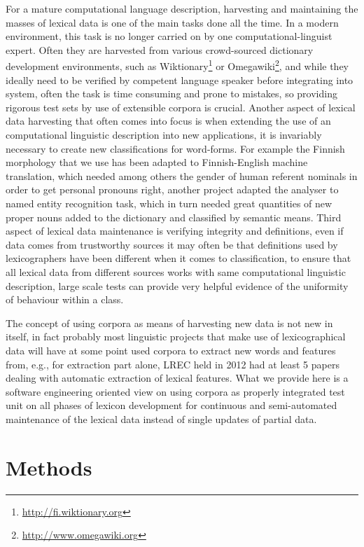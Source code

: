 \documentclass[a5paper]{article}
\begin{document}
For a mature computational language description, harvesting and maintaining the
masses of lexical data is one of the main tasks done all the time. In a modern
environment, this task is no longer carried on by one computational-linguist
expert. Often they are harvested from various crowd-sourced dictionary
development environments, such as
Wiktionary\footnote{\url{http://fi.wiktionary.org}} or
O\-mega\-wi\-ki\footnote{\url{http://www.omegawiki.org}}, and while they ideally
need to be verified by competent language speaker before integrating into
system, often the task is time consuming and prone to mistakes, so providing
rigorous test sets by use of extensible corpora is crucial. Another aspect of
lexical data harvesting that often comes into focus is when extending the use
of an computational linguistic description into new applications, it is
invariably necessary to create new classifications for word-forms. For example
the Finnish morphology that we use has been adapted to Finnish-English machine
translation, which needed among others the gender of human referent nominals in
order to get personal pronouns right, another project adapted the analyser to
named entity recognition task, which in turn needed great quantities of new
proper nouns added to the dictionary and classified by semantic means. Third
aspect of lexical data maintenance is verifying integrity and definitions, even
if data comes from trustworthy sources it may often be that definitions used by
lexicographers have been different when it comes to classification, to ensure
that all lexical data from different sources works with same computational
linguistic description, large scale tests can provide very helpful evidence of
the uniformity of behaviour within a class.

The concept of using corpora as means of harvesting new data is not new in
itself, in fact probably most linguistic projects that make use of
lexicographical data will have at some point used corpora to extract new words
and features from, e.g., for extraction part alone, LREC held in 2012 had at
least 5 papers dealing with automatic extraction of lexical features.  What we
provide here is a software engineering oriented view on using corpora as
properly integrated test unit on all phases of lexicon development for
continuous and semi-automated maintenance of the lexical data instead of single
updates of partial data.

\section{Methods}
\end{document}
